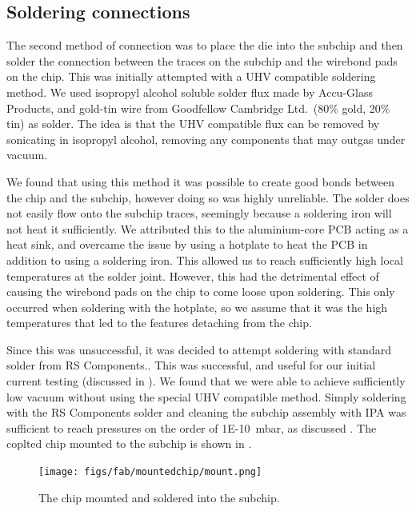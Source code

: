 \subsection{Soldering connections}
\label{fab:solder}

The second method of connection was to place the die into the subchip and then
solder the connection between the traces on the subchip and the wirebond pads
on the chip. This was initially attempted with a UHV compatible soldering
method. We used isopropyl alcohol soluble solder flux made by Accu-Glass
Products, and gold-tin wire from Goodfellow Cambridge Ltd.\ (80\% gold, 20\%
tin) as solder. The idea is that the UHV compatible flux can be removed by
sonicating in isopropyl alcohol, removing any components that may outgas under
vacuum.

We found that using this method it was possible to create good bonds between
the chip and the subchip, however doing so was highly unreliable. The solder
does not easily flow onto the subchip traces, seemingly because a soldering
iron will not heat it sufficiently. We attributed this to the aluminium-core
PCB acting as a heat sink, and overcame the issue by using a hotplate to heat
the PCB in addition to using a soldering iron. This allowed us to reach
sufficiently high  local temperatures at the solder joint.
%
However, this had the detrimental effect of causing the wirebond pads on the
chip to come loose upon soldering. This only occurred when soldering with the
hotplate, so we assume that it was the high temperatures that led to the
features detaching from the chip.

Since this was unsuccessful, it was decided to attempt soldering with standard
solder from RS Components.. This was successful, and useful for our initial current
testing (discussed in ). We found that we were able to
achieve sufficiently low vacuum without using the special UHV compatible
method. Simply soldering with the RS Components solder and cleaning the subchip
assembly with IPA was sufficient to reach pressures on the order of
\SI{1E-10}{\milli\bar}, as discussed . The coplted chip
mounted to the subchip is shown in .

\begin{figure}
  \centering
  \texttt{[image: figs/fab/mountedchip/mount.png]}
  \caption{The chip mounted and soldered into the subchip.}
  \label{fab:fig:mountedchip}
\end{figure}

